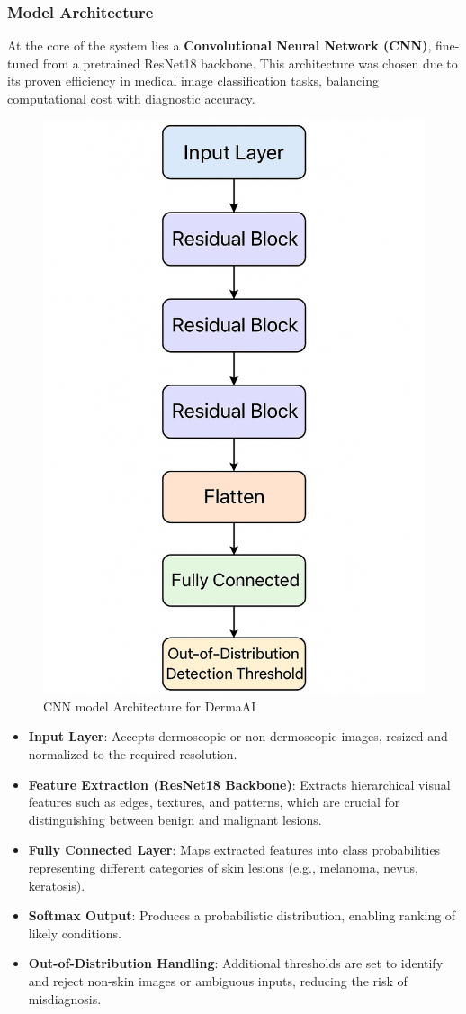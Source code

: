 \documentclass[
  12pt,
  oneside]{article}
\providecommand{\tightlist}{%
  \setlength{\itemsep}{0pt}\setlength{\parskip}{0pt}}
\begin{document}
\subsubsection{Model Architecture}\label{model-architecture-1}

At the core of the system lies a \textbf{Convolutional Neural Network
(CNN)}, fine-tuned from a pretrained ResNet18 backbone. This
architecture was chosen due to its proven efficiency in medical image
classification tasks, balancing computational cost with diagnostic
accuracy.

\begin{figure}

{\centering \includegraphics[width=0.5\linewidth]{cnn-architecture} 

}

\caption{CNN model Architecture for DermaAI}\label{fig:unnamed-chunk-16}
\end{figure}

\begin{itemize}
\tightlist
\item
  \textbf{Input Layer}: Accepts dermoscopic or non-dermoscopic images,
  resized and normalized to the required resolution.\\
\item
  \textbf{Feature Extraction (ResNet18 Backbone)}: Extracts hierarchical
  visual features such as edges, textures, and patterns, which are
  crucial for distinguishing between benign and malignant lesions.\\
\item
  \textbf{Fully Connected Layer}: Maps extracted features into class
  probabilities representing different categories of skin lesions (e.g.,
  melanoma, nevus, keratosis).\\
\item
  \textbf{Softmax Output}: Produces a probabilistic distribution,
  enabling ranking of likely conditions.\\
\item
  \textbf{Out-of-Distribution Handling}: Additional thresholds are set
  to identify and reject non-skin images or ambiguous inputs, reducing
  the risk of misdiagnosis.
\end{itemize}
\end{document}
